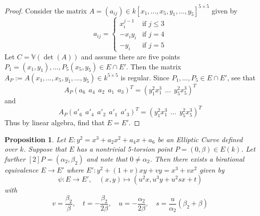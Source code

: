 \documentclass{scrartcl}
\newcommand{\V}{\mathbb{V}}
\newtheorem{prop}{Proposition}
\theoremstyle{definition}
\begin{document}
\begin{proof}
    Consider the matrix $A = (a_{ij}) \in k[x_1, ..., x_5, y_1, ..., y_5]^{5 \times 5}$ given by
    \begin{equation*}
        a_{ij} = \begin{cases}
            x_i^{j - 1} & \text{if $j \leq 3$} \\
            -x_iy_i & \text{if $j = 4$} \\
            -y_i & \text{if $j = 5$}
        \end{cases}
    \end{equation*}
    Let $C = \V(\det(A))$ and assume there are five points $P_1 = (x_1, y_1), ..., P_5(x_5, y_5) \in E \cap E'$.
    Then the matrix $A_P := A(x_1, ..., x_5, y_1, ..., y_5) \in k^{5 \times 5}$ is regular.
    Since $P_1, ..., P_5 \in E \cap E'$, see that
    \begin{equation*}
        A_P (a_6 \ \ a_4 \ \ a_2 \ \ a_1 \ \ a_3)^T = (y_1^2 x_1^3 \ \ ... \ \ y_5^2 x_5^3)^T
    \end{equation*}
    and
    \begin{equation*}
        A_P (a'_6 \ \ a'_4 \ \ a'_2 \ \ a'_1 \ \ a'_3)^T = (y_1^2 x_1^3 \ \ ... \ \ y_5^2 x_5^3)^T
    \end{equation*}
    Thus by linear algebra, find that $E = E'$.
\end{proof}
\begin{prop}
    \label{prop:characterization_5_torsion}
    Let $E: y^2 = x^3 + a_2 x^2 + a_4 x + a_6$ be an Elliptic Curve defined over $k$.
    Suppose that $E$ has a nontrivial 5-torsion point $P = (0, \beta) \in E(k)$.
    Let further $[2]P = (\alpha_2, \beta_2)$ and note that $0 \neq \alpha_2$.
    Then there exists a birational equivalence $E \to E'$ where $E': y^2 + (1 + v) x y + v y = x^3 + v x^2$ given by
    \begin{equation*}
        \psi: E \to E', \quad (x, y) \mapsto (u^2 x, u^3 y + u^2 s x + t)
    \end{equation*}
    with
    \begin{equation*}
        v = \frac {\beta_2} {\beta}, \quad t = -\frac {\beta_2} {2\beta}, \quad u = -\frac {\alpha_2} {2\beta}, \quad s = \frac {u} {\alpha_2} ( \beta_2 + \beta )
    \end{equation*}
\end{prop}
\end{document}
